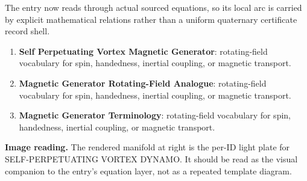 The entry now reads through actual sourced equations, so its local arc is carried by explicit mathematical relations rather than a uniform quaternary certificate record shell.
\endgroup

\begin{enumerate}[leftmargin=1.6em,itemsep=6pt,topsep=4pt]
\item \textbf{Self Perpetuating Vortex Magnetic Generator}: rotating-field vocabulary for spin, handedness, inertial coupling, or magnetic transport.
\item \textbf{Magnetic Generator Rotating-Field Analogue}: rotating-field vocabulary for spin, handedness, inertial coupling, or magnetic transport.
\item \textbf{Magnetic Generator Terminology}: rotating-field vocabulary for spin, handedness, inertial coupling, or magnetic transport.
\end{enumerate}

\begin{samepage}
\noindent\begin{minipage}[t]{0.45\linewidth}
\vspace{0pt}
\raggedright
\scriptsize\textbf{Image reading.} The rendered manifold at right is the per-ID light plate for SELF-PERPETUATING VORTEX DYNAMO. It should be read as the visual companion to the entry's equation layer, not as a repeated template diagram.\par
\end{minipage}\hfill
\begin{minipage}[t]{0.53\linewidth}
\vspace*{-0.10in}
\raggedright
{}
\end{minipage}
\end{samepage}

\clearpage


